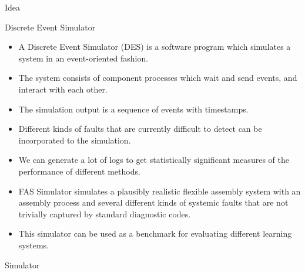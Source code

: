 \documentclass[final,xcolor={usenames,x11names}]{beamer}
\newlength{\onecolwid}
\begin{document}
\begin{frame}[t]
\begin{columns}[t]
\begin{column}{\onecolwid}
\begin{block}{Idea}
\end{block}

\vspace{6cm}

\begin{alertblock}{Discrete Event Simulator}

\begin{itemize}
 \item A Discrete Event Simulator (DES) is a software program which simulates a system in an event-oriented fashion.
 \item The system consists of component processes which wait and send events, and interact with each other.
 \item The simulation output is a sequence of events with timestamps.
 \item Different kinds of faults that are currently difficult to detect can be incorporated to the simulation.
 \item We can generate a lot of logs to get statistically significant measures of the performance of different methods.
 \item FAS Simulator simulates a plausibly realistic flexible assembly system with an assembly process and several different kinds of systemic faults that are not trivially captured by standard diagnostic codes.
 \item This simulator can be used as a benchmark for evaluating different learning systems.
\end{itemize}

\end{alertblock}

\vspace{2cm}

\begin{block}{Simulator}


\end{block}
\end{column}
\end{columns}
\end{frame}
\end{document}
